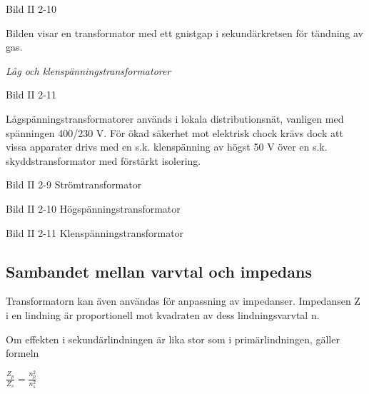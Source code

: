 Bild II 2-10

Bilden visar en transformator med ett gnistgap i sekundärkretsen för tändning av
gas.

\emph{Låg och klenspänningstransformatorer}

Bild II 2-11

Lågspänningstransformatorer används i lokala distributionsnät, vanligen med
spänningen 400/230 V. För ökad säkerhet mot elektrisk chock krävs dock att vissa
apparater drivs med en s.k. klenspänning av högst 50 V över en s.k.
skyddstransformator med förstärkt isolering.

Bild II 2-9 Strömtransformator

Bild II 2-10 Högspänningstransformator

Bild II 2-11 Klenspänningstransformator

\subsection{Sambandet mellan varvtal och impedans}

Transformatorn kan även användas för anpassning av impedanser. Impedansen Z i en
lindning är proportionell mot kvadraten av dess lindningsvarvtal n.

Om effekten i sekundärlindningen är lika stor som i primärlindningen, gäller
formeln

\(\frac{Z_p}{Z_s} = \frac{n_p^2}{n_s^2}\)
